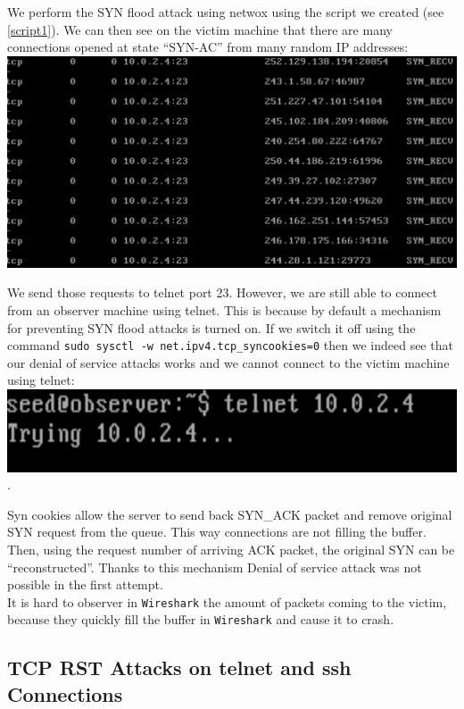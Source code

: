 \documentclass[12pt, a4paper, pdflatex]{article}
\begin{document}
We perform the SYN flood attack using netwox using the script we created (see \ref{script1}). We can then see on the victim machine that there are many connections opened at state ``SYN-AC'' from many random IP addresses:\\
\includegraphics[width=.95\textwidth]{gfx/syn-netstat.png}

We send those requests to telnet port 23. However, we are still able to connect from an observer machine using telnet. This is because by default a mechanism for preventing SYN flood attacks is turned on. If we switch it off using the command \texttt{sudo sysctl -w net.ipv4.tcp\_syncookies=0} then we indeed see that our denial of service attacks works and we cannot connect to the victim machine using telnet:\\

\includegraphics[width=.95\textwidth]{gfx/syn-telnet.png}.

Syn cookies allow the server to send back SYN\_ACK packet and remove original SYN request from the queue. This way connections are not filling the buffer. Then, using the request number of arriving ACK packet, the original SYN can be ``reconstructed''. Thanks to this mechanism Denial of service attack was not possible in the first attempt.\\

It is hard to observer in \texttt{Wireshark} the amount of packets coming to the victim, because they quickly fill the buffer in \texttt{Wireshark} and cause it to crash.

\subsection{TCP RST Attacks on telnet and ssh Connections}
\end{document}
